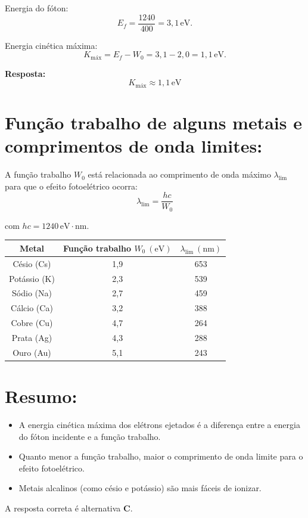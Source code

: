 \begin{flushleft}
Energia do fóton:
\[
E_f = \frac{1240}{400} = 3{,}1\,\mathrm{eV}.
\]

Energia cinética máxima:
\[
K_{\text{máx}} = E_f - W_0 = 3{,}1 - 2{,}0 = 1{,}1\,\mathrm{eV}.
\]

\textbf{Resposta:}
\[
\boxed{
K_{\text{máx}} \approx 1{,}1\,\mathrm{eV}
}
\]

\section*{Função trabalho de alguns metais e comprimentos de onda limites:}

A função trabalho \( W_0 \) está relacionada ao comprimento de onda máximo \( \lambda_{\text{lim}} \) para que o efeito fotoelétrico ocorra:
\[
\lambda_{\text{lim}} = \frac{hc}{W_0}
\]

com \( hc = 1240\,\mathrm{eV\cdot nm} \).

\bigskip

\begin{center}
\renewcommand{\arraystretch}{1.3}
\begin{tabular}{|c|c|c|}
\hline
\textbf{Metal} & \textbf{Função trabalho \( W_0~(\mathrm{eV}) \)} & \textbf{\( \lambda_{\text{lim}}~(\mathrm{nm}) \)} \\
\hline
Césio (Cs)     & 1,9 & 653 \\ \hline
Potássio (K)   & 2,3 & 539 \\ \hline
Sódio (Na)     & 2,7 & 459 \\ \hline
Cálcio (Ca)    & 3,2 & 388 \\ \hline
Cobre (Cu)     & 4,7 & 264 \\ \hline
Prata (Ag)     & 4,3 & 288 \\ \hline
Ouro (Au)      & 5,1 & 243 \\ \hline
\hline
\end{tabular}
\end{center}

\section*{Resumo:}
\begin{itemize}
    \item A energia cinética máxima dos elétrons ejetados é a diferença entre a energia do fóton incidente e a função trabalho.
    \item Quanto menor a função trabalho, maior o comprimento de onda limite para o efeito fotoelétrico.
    \item Metais alcalinos (como césio e potássio) são mais fáceis de ionizar.
\end{itemize}

A resposta correta é alternativa \colorbox{green!50}{\textbf{C}}.
\end{flushleft}


